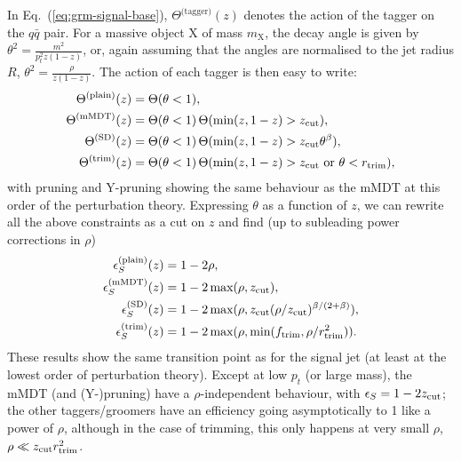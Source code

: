 In Eq.~(\ref{eq:grm-signal-base}), $\Theta^{\text{(tagger)}}(z)$
denotes the action of the tagger on the $q\bar q$ pair.
%
For a massive object X of mass $m_\text{X}$, the decay angle is given by
$\theta^2=\tfrac{m^2}{p_t^2z(1-z)}$, or, again assuming that the
angles are normalised to the jet radius $R$,
$\theta^2=\tfrac{\rho}{z(1-z)}$.
%
The action of each tagger is then easy to write:
\begin{align}
\Theta^{\text{(plain)}}(z) & = \Theta(\theta<1),\nonumber\\
\Theta^{\text{(mMDT)}}(z) & = \Theta(\theta<1)\,\Theta(\text{min}(z,1-z)>z_{\text{cut}}),\nonumber\\
\Theta^{\text{(SD)}}(z) & = \Theta(\theta<1)\,\Theta(\text{min}(z,1-z)>z_{\text{cut}}\theta^\beta),\nonumber\\
\Theta^{\text{(trim)}}(z) & = \Theta(\theta<1)\,\Theta(\text{min}(z,1-z)>z_{\text{cut}}\text{ or }\theta<r_{\text{trim}}),
\end{align}
with pruning and Y-pruning showing the same behaviour as the mMDT at
this order of the perturbation theory. Expressing $\theta$ as a
function of $z$, we can rewrite all the above constraints as a cut on
$z$ and find (up to subleading power corrections in $\rho$)
\begin{align}
\epsilon_S^{\text{(plain)}}(z) & = 1-2\rho,\nonumber\\
\epsilon_S^{\text{(mMDT)}}(z) & = 1-2\,\text{max}(\rho,z_{\text{cut}}),\nonumber\\
\epsilon_S^{\text{(SD)}}(z) & = 1-2\,\text{max}(\rho,z_{\text{cut}} (\rho/z_{\text{cut}})^{\beta/(2+\beta)}),\nonumber\\
\epsilon_S^{\text{(trim)}}(z) & = 1-2\,\text{max}(\rho, \text{min}(f_{\text{trim}},\rho/r_{\text{trim}}^2)).\label{eq:lo-grm-sig-eff}
\end{align}
These results show the same transition point as for the signal jet (at
least at the lowest order of perturbation theory). Except at low $p_t$
(or large mass), the mMDT (and (Y-)pruning) have a $\rho$-independent
behaviour, with $\epsilon_S=1-2z_{\text{cut}}$; the other taggers/groomers have
an efficiency going asymptotically to 1 like a power of $\rho$,
although in the case of trimming, this only happens at very small
$\rho$, $\rho\ll z_{\text{cut}}r_{\text{trim}}^2$.

